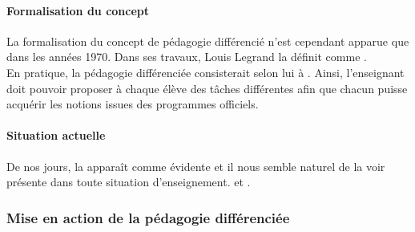 \paragraph{Formalisation du concept}
%
%
La formalisation du concept de pédagogie différencié n'est cependant apparue que dans les années 1970. Dans ses travaux, Louis Legrand la définit comme \textcite{un effort de diversification méthodologique susceptible de répondre à la diversité des élèves} \citep{legrand_differenciation_1986}.
\\
En pratique, la pédagogie différenciée consisterait selon lui à \textcite{utiliser toutes les ressources possibles pour permettre aux élèves de développer leurs connaissances, ce qui suppose la diversité des démarches mais aussi des outils} \citep{battut_comment_2009}.
%
Ainsi, l'enseignant doit pouvoir proposer à chaque élève des tâches différentes afin que chacun puisse acquérir les notions issues des programmes officiels. 






\paragraph{Situation actuelle}
%
%
De nos jours, la \textcite{pédagogie différenciée} apparaît comme évidente et il nous semble naturel de la voir présente dans toute situation d'enseignement. \textcite{[Elle] est une réalité quotidienne incontestable} \citep{perrenoud_pedagogie_1995} et \textcite{est toujours là d'abord, avant tout effort pédagogique particulier, comme une réalité sociologique observable} \citep{meirieu_pedagogie_1996}.



\subsubsection{Mise en action de la pédagogie différenciée}



